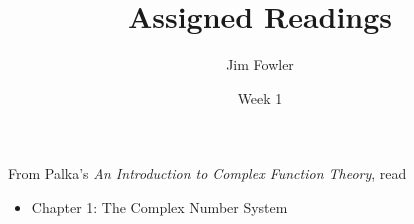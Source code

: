 \documentclass{homework}
\author{Jim Fowler}
\title{Assigned Readings}
\date{Week 1}
\begin{document}
\maketitle

From Palka's \textit{An Introduction to Complex Function Theory}, read
\begin{itemize}
\item Chapter 1: The Complex Number System
\end{itemize}
\end{document}
